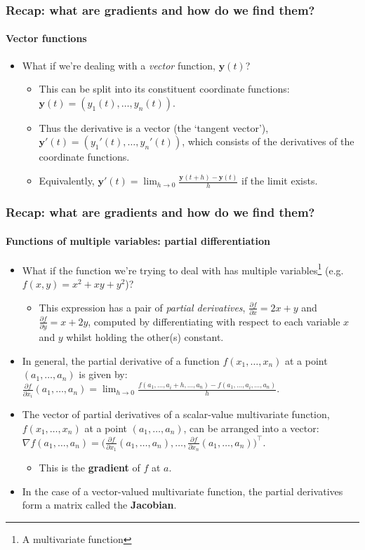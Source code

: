 \documentclass[]{article}
\begin{document}
\begin{frame}
\frametitle{Recap: what are gradients and how do we find them?}
\framesubtitle{Vector functions}
\begin{itemize}
	\item<+-> What if we're dealing with a \emph{vector} function, $\bm y(t)$?
	\begin{itemize}
		\item<+-> This can be split into its constituent coordinate functions: $\bm y(t) = (y_1(t),\dots,y_n(t))$.
		\item<+-> Thus the derivative is a vector (the `tangent vector'), $\bm y'(t)=(y_1'(t),\dots,y_n'(t))$, which consists of the derivatives of the coordinate functions.
		\item<+-> Equivalently, $\bm y'(t) = \lim_{h\to0} \frac{\bm y(t+h) - \bm y(t)}{h}$ if the limit exists.
	\end{itemize}
\end{itemize}
\end{frame}

\begin{frame}
\frametitle{Recap: what are gradients and how do we find them?}
\framesubtitle{Functions of multiple variables: partial differentiation}

\begin{itemize}
	\item What if the function we're trying to deal with has multiple variables\footnote{A multivariate function} (e.g. $f(x, y) = x^2 + xy + y^2$)?
	\begin{itemize}
		\item<+-> This expression has a pair of \emph{partial derivatives}, $\frac{\partial f}{\partial x} = 2x+y$ and $\frac{\partial f}{\partial y} = x + 2y$, computed by differentiating with respect to each variable $x$ and $y$ whilst holding the other(s) constant.
	\end{itemize}
	\item<+-> In general, the partial derivative of a function $f(x_1,\dots,x_n)$ at a point $(a_1,\dots,a_n)$ is given by: \\ $\frac{\partial f}{\partial x_i}(a_1,\dots,a_n) = \lim_{h\to0}\frac{f(a_1,\dots,a_i+h,\dots,a_n)-f(a_1,\dots,a_i,\dots,a_n)}{h}$.
	\item<+-> The vector of partial derivatives of a scalar-value multivariate function, $f(x_1,\dots,x_n)$ at a point $(a_1,\dots,a_n)$, can be arranged into a vector:
	$\nabla f(a_1,\dots,a_n) = \big(\frac{\partial f}{\partial x_1}(a_1,\dots,a_n), \dots, \frac{\partial f}{\partial x_n}(a_1,\dots,a_n) \big)^\top$.
	\begin{itemize}
		\item<+-> This is the \textbf{gradient} of $f$ at $a$.
	\end{itemize}
	\item<+-> In the case of a vector-valued multivariate function, the partial derivatives form a matrix called the \textbf{Jacobian}.
\end{itemize}
\end{frame}
\end{document}
